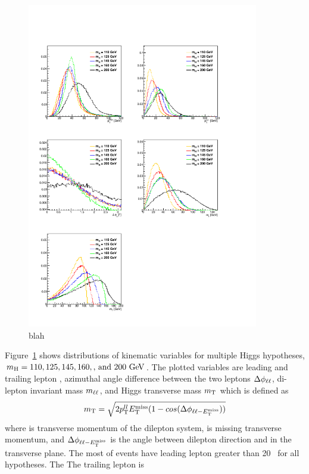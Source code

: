 \begin{figure}[htp]
\centering
\includegraphics[width=0.9\textwidth]{figures/hww_gen_all.pdf}
\caption{ blah }
\label{fig:genhww}
\end{figure}
Figure~\ref{fig:genhww} shows distributions of kinematic variables for 
multiple Higgs hypotheses, $m_{\mathrm{H}} = 110, 125, 145, 160,\textrm{, and } 200~\mathrm{Ge\kern -0.1em V}$. 
The plotted variables are leading and trailing lepton \pt, 
azimuthal angle difference between the two leptons $\Delta\phi_{\ell\ell}$, 
di-lepton invariant mass $m_{\ell\ell}$, and Higgs transverse mass $m_{\mathrm{T}}$ which is 
defined as 
\begin{eqnarray} 
m_{\mathrm{T}} = \sqrt{2p_\mathrm{T}^{ll}E_\mathrm{T}^{\mathrm{miss}}(1-cos(\Delta\phi_{\ell\ell-E_\mathrm{T}^{\mathrm{miss}}}))}
\end{eqnarray} 
where \pt{} is transverse momentum of the dilepton system, 
\met{} is missing transverse momentum, and  
$\Delta\phi_{\ell\ell-E_\mathrm{T}^{\mathrm{miss}}}$ is the angle between dilepton
direction and \met in the transverse plane.
The most of events have leading lepton \ptlmax{} greater than 20~\GeV{} 
for all \mHi{} hypotheses. The The trailing lepton \ptlmin{} is 
